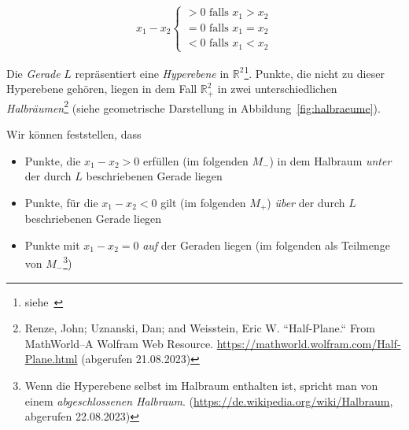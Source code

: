 \begin{equation}
x_1 - x_2 \begin{cases}
               > 0 \text{ falls } x_1 > x_2 \\
               = 0 \text{ falls } x_1 = x_2 \\
               < 0 \text{ falls } x_1 < x_2
\end{cases}
\end{equation}

Die \textit{Gerade} $L$ repräsentiert eine \textit{Hyperebene} in $\mathbb{R}^2$\footnote{
    siehe~\cite[81, Definition 2.3]{BHW+12}
}.
Punkte, die nicht zu dieser Hyperebene gehören, liegen in dem Fall $\mathbb{R}_+^2$ in zwei unterschiedlichen \textit{Halbräumen}\footnote{
    Renze, John; Uznanski, Dan; and Weisstein, Eric W. ``Half-Plane.`` From MathWorld--A Wolfram Web Resource. \url{https://mathworld.wolfram.com/Half-Plane.html} (abgerufen 21.08.2023)
} (siehe geometrische Darstellung in Abbildung~\ref{fig:halbraeume}).

Wir können feststellen, dass


\begin{itemize}
    \item Punkte, die $x_1 - x_2 > 0$ erfüllen (im folgenden $M_-$) in dem Halbraum \textit{unter} der durch $L$ beschriebenen Gerade liegen
    \item Punkte, für die  $x_1 - x_2 < 0$ gilt (im folgenden $M_+$) \textit{über} der durch $L$ beschriebenen Gerade liegen
    \item Punkte mit $x_1 - x_2 = 0$ \textit{auf} der Geraden liegen (im folgenden als Teilmenge von $M_-$\footnote{
        Wenn die Hyperebene selbst im Halbraum enthalten ist, spricht man von einem \textit{abgeschlossenen Halbraum}. (\url{https://de.wikipedia.org/wiki/Halbraum}, abgerufen 22.08.2023)
    })
\end{itemize}


